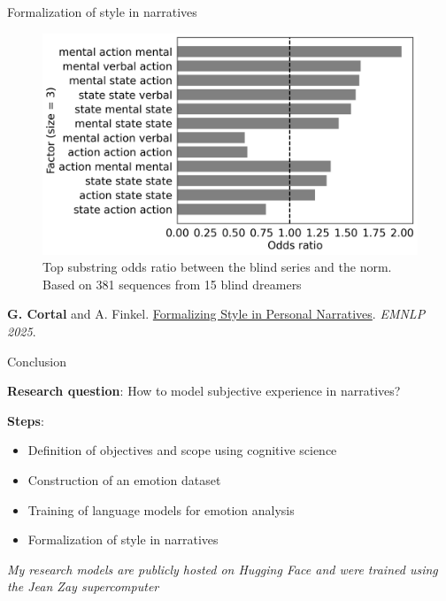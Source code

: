 \documentclass[handout,10pt]{beamer}
\begin{document}
\begin{frame}{Formalization of style in narratives}

\begin{figure}
    \centering
    \includegraphics[width=0.8\linewidth]{img/blind_odds_3.png}
    \caption{Top substring odds ratio between the blind series and the norm. Based on 381 sequences from 15 blind dreamers}
    \label{fig:placeholder}
\end{figure}

\vspace{0.5cm}

\scriptsize

\textbf{G. Cortal} and A. Finkel. \href{https://gustavecortal.com/data/Formalizing_Style_in_Personal_Narratives.pdf}{Formalizing Style in Personal Narratives}. \textit{EMNLP 2025}.
    
\end{frame}

\begin{frame}{Conclusion}

\textbf{Research question}: How to model subjective experience in narratives?

\vspace{0.5cm}
\pause

\textbf{Steps}:

\begin{itemize}[<+->]
    \item Definition of objectives and scope using cognitive science
    \item Construction of an emotion dataset 
    \item Training of language models for emotion analysis 
    \item Formalization of style in narratives
\end{itemize}

\vspace{0.5cm}

\small

\textit{My research models are publicly hosted on Hugging Face and were trained using the Jean Zay supercomputer}
    
\end{frame}
\end{document}
